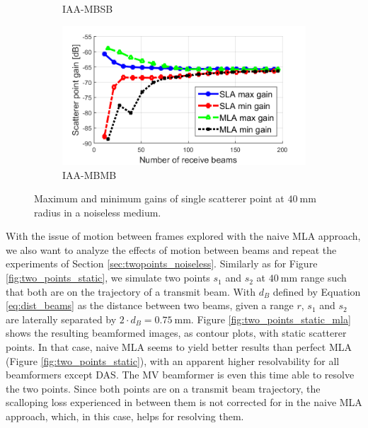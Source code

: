 \begin{figure}[ht]
\begin{subfigure}[t]{0.48\linewidth}
        \caption{IAA-MBSB}
    \end{subfigure}
    \quad
    \begin{subfigure}[t]{0.48\linewidth}
        \includegraphics[width=\linewidth]{./images/results/4/gain_IAA-MBMB.png}
        \caption{IAA-MBMB}
    \end{subfigure}
	\caption{Maximum and minimum gains of single scatterer point at $40~$mm radius in a noiseless medium.}
	\label{fig:gain_comparison}
\end{figure}

With the issue of motion between frames explored with the naive MLA approach, we also want to analyze the effects of motion between beams and repeat the experiments of Section \ref{sec:twopoints_noiseless}.
Similarly as for Figure \ref{fig:two_points_static}, we simulate two points $s_1$ and $s_2$ at $40~$mm range such that both are on the trajectory of a transmit beam. With $d_B$ defined by Equation \ref{eq:dist_beams} as the distance between two beams, given a range $r$, $s_1$ and $s_2$ are laterally separated by $2 \cdot d_B = 0.75~$mm.
Figure \ref{fig:two_points_static_mla} shows the resulting beamformed images, as contour plots, with static scatterer points.
In that case, naive MLA seems to yield better results than perfect MLA (Figure \ref{fig:two_points_static}), with an apparent higher resolvability for all beamformers except DAS. The MV beamformer is even this time able to resolve the two points.
Since both points are on a transmit beam trajectory, the scalloping loss experienced in between them is not corrected for in the naive MLA approach, which, in this case, helps for resolving them.

